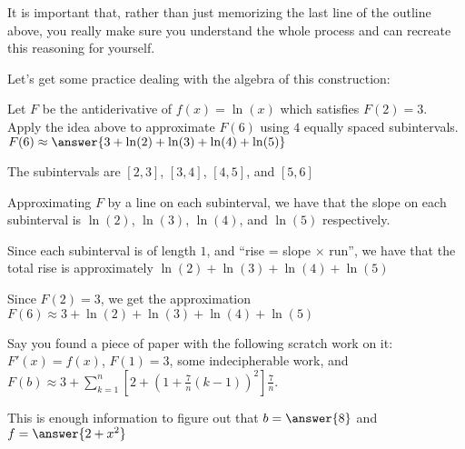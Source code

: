 \documentclass{ximera}
\begin{document}
	It is important that, rather than just memorizing the last line of the outline above, you really make sure you understand the whole process and can recreate this reasoning for yourself.  
	
	Let's get some practice dealing with the algebra of this construction:
	
	\begin{question}
		Let $F$ be the antiderivative of $f(x) = \ln(x)$ which satisfies $F(2) = 3$.  Apply the idea above to approximate $F(6)$ using $4$ equally spaced subintervals.  $F(6) \approx \answer{3+ \ln(2) + \ln(3) + \ln(4) + \ln(5)}$
		\begin{hint}
			The subintervals are $[2,3]$, $[3,4]$, $[4,5]$, and $[5,6]$
		\end{hint}
		\begin{hint}
			Approximating $F$ by a line on each subinterval, we have that the slope on each subinterval is $\ln(2)$, $\ln(3)$, $\ln(4)$,  and $\ln(5)$ respectively.
		\end{hint}
		\begin{hint}
			Since each subinterval is of length $1$, and ``rise = slope $\times$ run'', we have that the total rise is approximately $\ln(2) + \ln(3) + \ln(4) + \ln(5)$ 
		\end{hint}
		\begin{hint}
			Since $F(2) = 3$, we get the approximation $F(6) \approx 3+ \ln(2) + \ln(3) + \ln(4) + \ln(5)$
		\end{hint}
	\end{question}
	
	\begin{question}
		Say you found a piece of paper with the following scratch work on it: $F'(x) =f(x)$,  $F(1) = 3$, some indecipherable work, and $F(b) \approx 3 + \sum_{k=1}^{n} \left[2+ ( 1+ \frac{7}{n}(k-1))^2 \right ] \frac{7}{n}$.
		
		This is enough information to figure out that $b = \answer{8}$   and $f = \answer{2+x^2}$
	\end{question}
\end{document}
